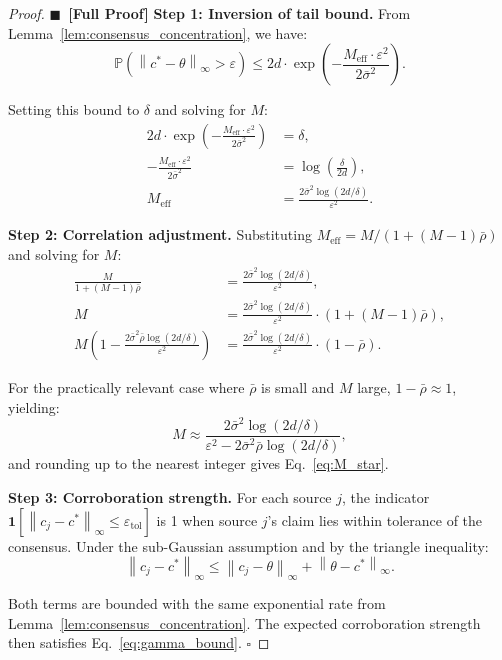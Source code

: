 \documentclass[11pt,a4paper]{article}
\theoremstyle{definition}
\newcommand{\rigorFull}[0]{$\blacksquare$~\textbf{[Full Proof]}}
\newcommand{\Pbb}{\mathbb{P}}
\newcommand{\ind}[1]{\mathbf{1}[#1]}
\newcommand{\norm}[1]{\left\lVert#1\right\rVert}
\begin{document}
\begin{proof}\rigorFull
\textbf{Step 1: Inversion of tail bound.} From Lemma~\ref{lem:consensus_concentration}, we have:
\begin{equation}
    \Pbb(\norm{c^* - \theta}_\infty > \varepsilon) \leq 2d \cdot \exp\left(-\frac{M_{\mathrm{eff}} \cdot \varepsilon^2}{2\bar{\sigma}^2}\right).
    \label{eq:tail_for_inversion}
\end{equation}

Setting this bound to $\delta$ and solving for $M$:
\begin{align}
    2d \cdot \exp\left(-\frac{M_{\mathrm{eff}} \cdot \varepsilon^2}{2\bar{\sigma}^2}\right) &= \delta, \\
    -\frac{M_{\mathrm{eff}} \cdot \varepsilon^2}{2\bar{\sigma}^2} &= \log\left(\frac{\delta}{2d}\right), \\
    M_{\mathrm{eff}} &= \frac{2\bar{\sigma}^2 \log(2d/\delta)}{\varepsilon^2}.
    \label{eq:Meff_solved}
\end{align}

\textbf{Step 2: Correlation adjustment.} Substituting $M_{\mathrm{eff}} = M / (1 + (M-1)\bar{\rho})$ and solving for $M$:
\begin{align}
    \frac{M}{1 + (M-1)\bar{\rho}} &= \frac{2\bar{\sigma}^2 \log(2d/\delta)}{\varepsilon^2}, \\
    M &= \frac{2\bar{\sigma}^2 \log(2d/\delta)}{\varepsilon^2} \cdot (1 + (M-1)\bar{\rho}), \\
    M(1 - \frac{2\bar{\sigma}^2 \bar{\rho} \log(2d/\delta)}{\varepsilon^2}) &= \frac{2\bar{\sigma}^2 \log(2d/\delta)}{\varepsilon^2} \cdot (1 - \bar{\rho}).
    \label{eq:M_solve}
\end{align}

For the practically relevant case where $\bar{\rho}$ is small and $M$ large, $1 - \bar{\rho} \approx 1$, yielding:
\begin{equation}
    M \approx \frac{2\bar{\sigma}^2 \log(2d/\delta)}{\varepsilon^2 - 2\bar{\sigma}^2 \bar{\rho} \log(2d/\delta)},
    \label{eq:M_approx}
\end{equation}
and rounding up to the nearest integer gives Eq.~\eqref{eq:M_star}.

\textbf{Step 3: Corroboration strength.} For each source $j$, the indicator $\ind{\norm{c_j - c^*}_\infty \leq \varepsilon_{\mathrm{tol}}}$ is 1 when source $j$'s claim lies within tolerance of the consensus. Under the sub-Gaussian assumption and by the triangle inequality:
\begin{equation}
    \norm{c_j - c^*}_\infty \leq \norm{c_j - \theta}_\infty + \norm{\theta - c^*}_\infty.
    \label{eq:triangle}
\end{equation}

Both terms are bounded with the same exponential rate from Lemma~\ref{lem:consensus_concentration}. The expected corroboration strength then satisfies Eq.~\eqref{eq:gamma_bound}. $\square$
\end{proof}
\end{document}
